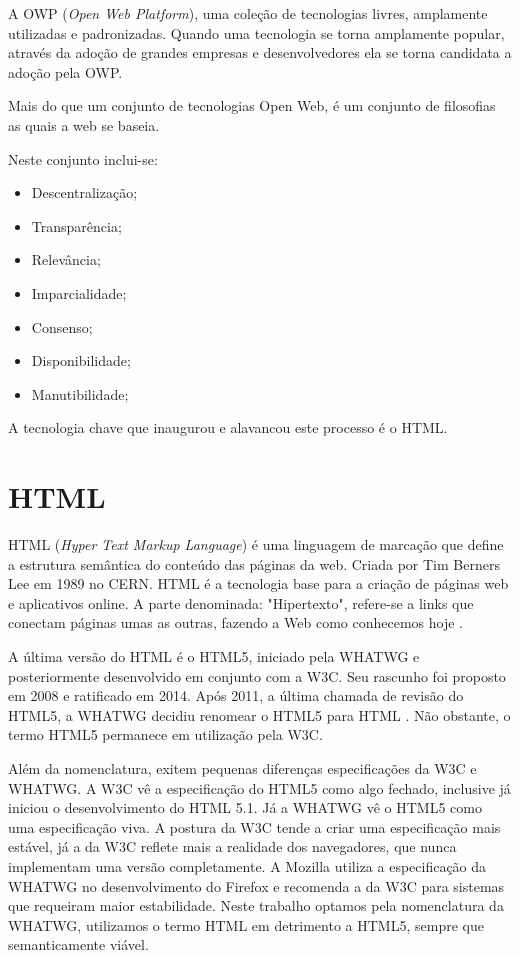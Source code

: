 \documentclass[
12pt,
a4paper,
portuges,
draft
]{report}
\begin{document}
A OWP (\textit{Open Web Platform}), uma coleção de tecnologias livres,
amplamente utilizadas e padronizadas.
Quando uma tecnologia se torna amplamente popular, através da
adoção de grandes empresas e desenvolvedores ela se torna candidata a
adoção pela OWP.

Mais do que um conjunto de tecnologias Open Web, é um conjunto de
filosofias as quais a web se baseia.

Neste conjunto inclui-se:

\begin{itemize}
\item Descentralização;
\item Transparência;
\item Relevância;
\item Imparcialidade;
\item Consenso;
\item Disponibilidade;
\item Manutibilidade;
\end{itemize}

A tecnologia chave que inaugurou e alavancou este processo é o HTML.

\section{HTML}

HTML (\textit{Hyper Text Markup Language}) é uma linguagem de
marcação que define a estrutura semântica do conteúdo das páginas
da web. Criada por Tim Berners Lee em 1989 no CERN. HTML é a tecnologia
base para a criação de páginas web e aplicativos online. A parte
denominada: "Hipertexto", refere-se a links que conectam páginas umas
as outras, fazendo a Web como conhecemos hoje
\autocite{mdn2015}.

A última versão do HTML é o HTML5, iniciado pela WHATWG
e posteriormente desenvolvido em conjunto com a W3C.
Seu rascunho foi proposto em 2008 e ratificado em 2014.
Após 2011, a última chamada de revisão do HTML5,
a WHATWG decidiu renomear o HTML5 para HTML
\autocite{htmlIsTheNewHtml5}. Não obstante, o termo HTML5
permanece em utilização pela W3C.

Além da nomenclatura, exitem pequenas diferenças especificações da W3C e WHATWG. A
W3C vê a especificação do HTML5 como algo fechado, inclusive já
iniciou o desenvolvimento do HTML 5.1. Já a WHATWG vê o HTML5 como uma
especificação viva. A postura da W3C tende a criar uma especificação
mais estável, já a da W3C reflete mais a realidade dos navegadores,
que nunca implementam uma versão completamente. A Mozilla utiliza a
especificação da WHATWG no desenvolvimento do Firefox e recomenda a
da W3C para sistemas que requeiram maior estabilidade. Neste trabalho
optamos pela nomenclatura da WHATWG, utilizamos o termo HTML em
detrimento a HTML5, sempre que semanticamente viável.
\end{document}
